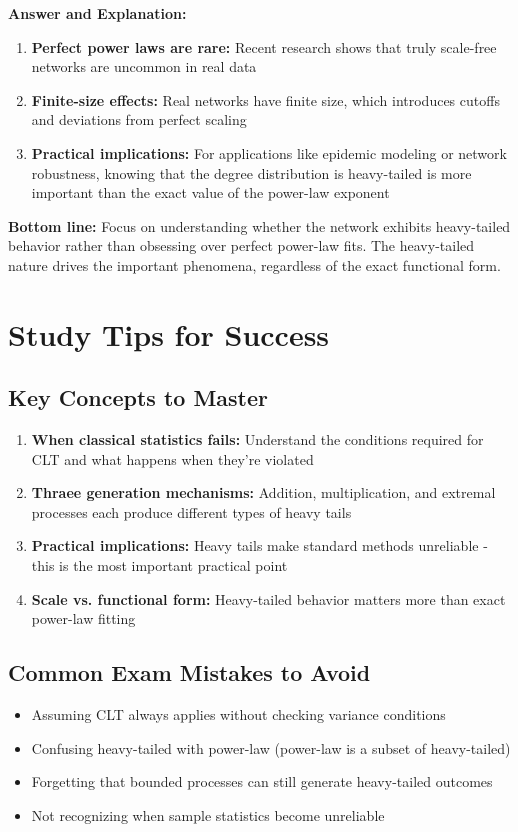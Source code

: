 \documentclass[11pt]{article}
\newenvironment{answer}{\color{answercolor}\begin{framed}\textbf{Answer and Explanation:}}{\end{framed}}
\begin{document}
\begin{answer}
\begin{enumerate}
    \item \textbf{Perfect power laws are rare:} Recent research shows that truly scale-free networks are uncommon in real data
    
    \item \textbf{Finite-size effects:} Real networks have finite size, which introduces cutoffs and deviations from perfect scaling
    
    \item \textbf{Practical implications:} For applications like epidemic modeling or network robustness, knowing that the degree distribution is heavy-tailed is more important than the exact value of the power-law exponent
\end{enumerate}

\textbf{Bottom line:} Focus on understanding whether the network exhibits heavy-tailed behavior rather than obsessing over perfect power-law fits. The heavy-tailed nature drives the important phenomena, regardless of the exact functional form.
\end{answer}

\section*{Study Tips for Success}

\subsection*{Key Concepts to Master}
\begin{enumerate}
    \item \textbf{When classical statistics fails:} Understand the conditions required for CLT and what happens when they're violated
    \item \textbf{Thraee generation mechanisms:} Addition, multiplication, and extremal processes each produce different types of heavy tails
    \item \textbf{Practical implications:} Heavy tails make standard methods unreliable - this is the most important practical point
    \item \textbf{Scale vs. functional form:} Heavy-tailed behavior matters more than exact power-law fitting
\end{enumerate}

\subsection*{Common Exam Mistakes to Avoid}
\begin{itemize}
    \item Assuming CLT always applies without checking variance conditions
    \item Confusing heavy-tailed with power-law (power-law is a subset of heavy-tailed)
    \item Forgetting that bounded processes can still generate heavy-tailed outcomes
    \item Not recognizing when sample statistics become unreliable
\end{itemize}
\end{document}
